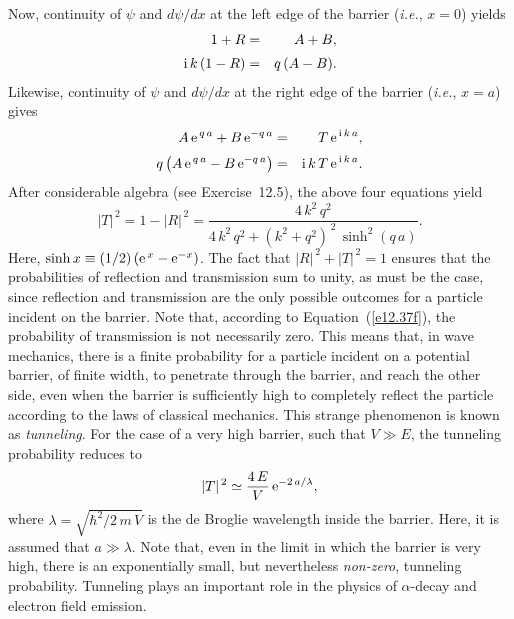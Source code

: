 Now, continuity of $\psi$ and $d \psi/d x$ at the left edge of
the barrier ({\em i.e.}, $x=0$) yields
\begin{eqnarray}\label{e12.126}
1 + R &=& A+B,\\[0.5ex]
{\rm i}\,k\,(1-R) &=& q\,(A-B).
\end{eqnarray}
Likewise, continuity of $\psi$ and $d\psi/d x$ at the right edge of
the barrier ({\em i.e.}, $x=a$) gives
\begin{eqnarray}
A\, {\rm e}^{\,q\,a}+ B \,{\rm e}^{-q\,a} &=& T\,{\rm e}^{\,{\rm i}\,k\,a},\\[0.5ex]
q\left(A\, {\rm e}^{\,q\,a}-B \,{\rm e}^{-q\,a}\right) &=& {\rm i}\,k\,T\,{\rm e}^{\,{\rm i}\,k\,a}.\label{e12.129}
\end{eqnarray}
After considerable algebra (see Exercise~12.5), the above four equations yield
\begin{equation}\label{e12.37f}
|T|^{\,2} = 1-|R|^{\,2}= \frac{4\,k^2\,q^2}{4\,k^2\,q^2 + (k^2+q^2)^{\,2}\,\sinh^2(q\,a)}.
\end{equation}
Here, $\sinh x\equiv (1/2)\,({\rm e}^{\,x}-{\rm e}^{-x})$. 
The fact that $|R|^{\,2}+|T|^{\,2}=1$ ensures that the probabilities of reflection and
transmission sum to unity, as must be the case, since reflection and transmission
are the only possible outcomes for a particle incident on the barrier.
Note that, according to Equation~(\ref{e12.37f}), the probability of transmission 
is not necessarily zero. This means that, in wave mechanics, there is a finite probability for a particle incident on
a potential barrier, of finite width, to penetrate through the barrier, and reach the other side, even when the barrier
is sufficiently high to completely reflect the particle according to the laws of classical mechanics. This
strange phenomenon is known as {\em tunneling}. For the case of a very high barrier, such that
$V\gg E$, the tunneling probability reduces to
\begin{equation}
|T|^{\,2}\simeq \frac{4\,E}{V}\,{\rm e}^{-2\,a/\lambda},
\end{equation}
where $\lambda = \sqrt{\hbar^2/2\,m\,V}$ is the de Broglie wavelength inside the barrier. Here, it
is assumed that $a\gg\lambda$. 
Note that, even in the limit in which  the barrier is very high, there is an exponentially small, but nevertheless {\em non-zero}, tunneling probability. Tunneling plays an important role in the physics
of $\alpha$-decay and electron field emission. 

